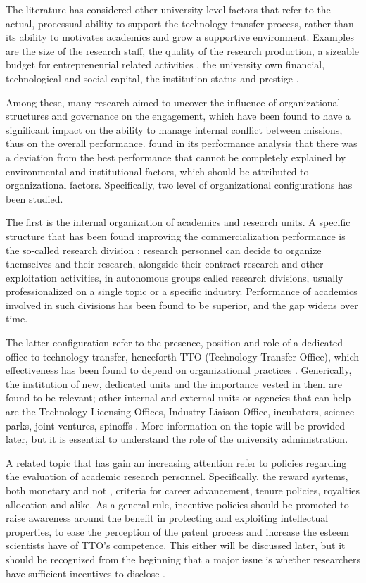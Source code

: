 The literature has considered other university-level factors that refer to the actual, processual ability to support the technology transfer process, rather than its ability to motivates academics and grow a supportive environment. Examples are the size of the research staff, the quality of the research production, a sizeable budget for entrepreneurial related activities \citep{Colombo2010}, the university own financial, technological and social capital, the institution status and prestige \citep{Guerrero2014}.

Among these, many research aimed to uncover the influence of organizational structures and governance on the engagement, which have been found to have a significant impact on the ability to manage internal conflict between missions, thus on the overall performance. \citet{Siegel2003a} found in its performance analysis that there was a deviation from the best performance that cannot be completely explained by environmental and institutional factors, which should be attributed to organizational factors. Specifically, two level of organizational configurations has been studied.

The first is the internal organization of academics and research units. A specific structure that has been found improving the commercialization performance is the so-called research division \citep{VanLooy2004}: research personnel can decide to organize themselves and their research, alongside their contract research and other exploitation activities, in autonomous groups called research divisions, usually professionalized on a single topic or a specific industry. Performance of academics involved in such divisions has been found to be superior, and the gap widens over time.

The latter configuration refer to the presence, position and role of a dedicated office to technology transfer, henceforth TTO (Technology Transfer Office), which effectiveness has been found to depend on organizational practices \citep{Siegel2003a}. Generically, the institution of new, dedicated units and the importance vested in them are found to be relevant; other internal and external units or agencies that can help are the Technology Licensing Offices, Industry Liaison Office, incubators, science parks, joint ventures, spinoffs \citep{Tijssen2006}. More information on the topic will be provided later, but it is essential to understand the role of the university administration.

A related topic that has gain an increasing attention refer to policies regarding the evaluation of academic research personnel. Specifically, the reward systems, both monetary and not \citep{Guerrero2014}, criteria for career advancement, tenure policies, royalties allocation and alike. As a general rule, incentive policies should be promoted to raise awareness around the benefit in protecting and exploiting intellectual properties, to ease the perception of the patent process and increase the esteem scientists have of TTO's competence. This either will be discussed later, but it should be recognized from the beginning that a major issue is whether researchers have sufficient incentives to disclose \citep{Debackere2005}.

